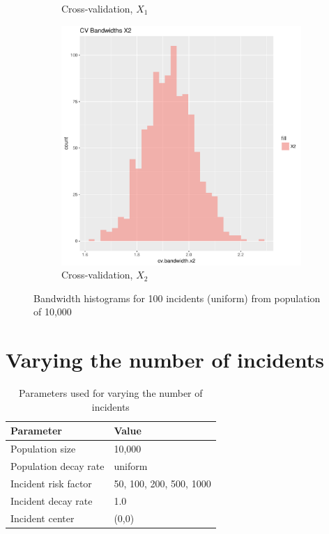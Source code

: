 \begin{figure}[htbp]
\begin{subfigure}[b]{0.3\textwidth}
    \caption{Cross-validation, \(X_1\)}
    \label{fig:bandwidths_x1:unif_100_unif:x1}
    \end{subfigure}
    \begin{subfigure}[b]{0.3\textwidth}
    \includegraphics[width=\textwidth]{results/unif_100_unif/output/bandwidths-x2}
    \caption{Cross-validation, \(X_2\)}
    \label{fig:bandwidths_x1:unif_100_unif:x2}
    \end{subfigure}
    \caption{Bandwidth histograms for 100 incidents (uniform) from population of 10,000}
\end{figure}


\section{Varying the number of incidents}
\label{sec:results:unif_NCases_1h}

\begin{table}[htbp]
\centering
\begin{tabular}{ll}
\hline
Parameter & Value \\
\hline
Population size & 10,000 \\
Population decay rate & uniform \\
Incident risk factor & 50, 100, 200, 500, 1000 \\
Incident decay rate & 1.0 \\
Incident center & (0,0) \\
\hline
\end{tabular}
\caption{Parameters used for varying the number of incidents}
\label{tbl:params:unif_NCases_1h}
\end{table}

